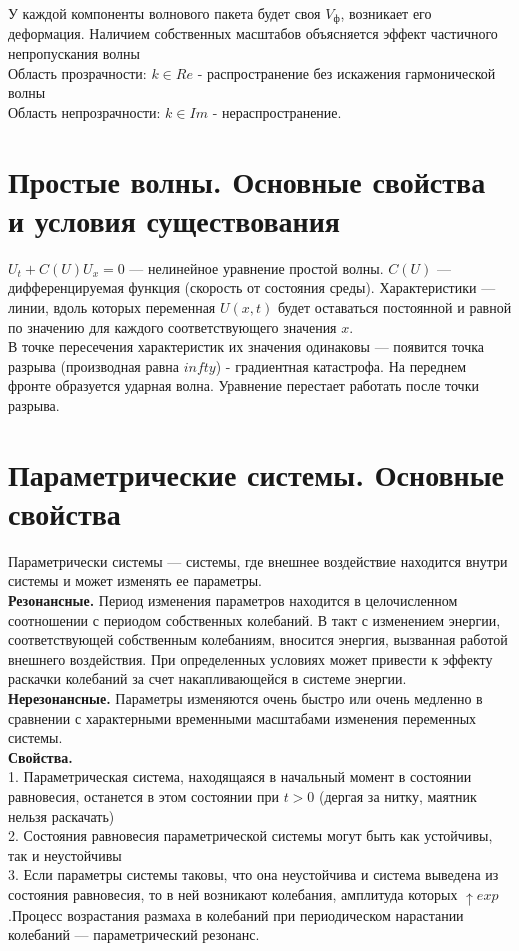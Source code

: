 \begin{multicols*}{2}
		У каждой компоненты волнового пакета будет своя $V_\text{ф}$, возникает его деформация. Наличием собственных масштабов объясняется эффект частичного непропускания волны\\
		Область прозрачности: $k\in Re$ - распространение без искажения гармонической волны\\
		Область непрозрачности: $k\in Im$ - нераспространение.

		\section{Простые волны. Основные свойства и условия существования}
		$U_t + C(U)U_x = 0$ — нелинейное уравнение простой волны. $C(U)$ — дифференцируемая функция (скорость от состояния среды). Характеристики — линии, вдоль которых переменная $U(x, t)$ будет оставаться постоянной и равной по значению для каждого соответствующего значения $x$.\\
		В точке пересечения характеристик их значения одинаковы — появится точка разрыва (производная равна $infty$) -  градиентная катастрофа. На переднем фронте образуется ударная волна. Уравнение перестает работать после точки разрыва.

		\section{Параметрические системы. Основные свойства}
		Параметрически системы — системы, где внешнее воздействие находится внутри системы и может изменять ее параметры.\\
		\textbf{Резонансные. } Период изменения параметров находится в целочисленном соотношении с периодом собственных колебаний. В такт с изменением энергии, соответствующей собственным колебаниям, вносится энергия, вызванная работой внешнего воздействия. При определенных условиях может привести к эффекту раскачки колебаний за счет накапливающейся в системе энергии. \\
		\textbf{Нерезонансные. }Параметры изменяются очень быстро или очень медленно в сравнении с характерными временными масштабами изменения переменных системы.\\
		\textbf{Свойства.}\\
		1. Параметрическая система, находящаяся в начальный момент в состоянии равновесия, останется в этом состоянии при $t>0$ (дергая за нитку, маятник нельзя раскачать)\\
		2. Состояния равновесия параметрической системы могут быть как устойчивы, так и неустойчивы\\
		3. Если параметры системы таковы, что она неустойчива и система выведена из состояния равновесия, то в ней возникают колебания, амплитуда которых $\uparrow exp$.Процесс возрастания размаха в колебаний при периодическом нарастании колебаний — параметрический резонанс.


\end{multicols*}
